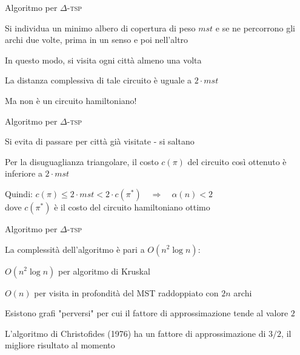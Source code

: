\begin{frame}{Algoritmo per $\Delta$-\textsc{tsp}}

\vspace{-9pt}
\BIL
\item Si individua un minimo albero di copertura di peso $\mathit{mst}$ e se ne percorrono gli archi due volte, prima in un senso e poi nell'altro 
\item In questo modo, si visita ogni città almeno una volta
\item La distanza complessiva di tale circuito è uguale a $2 \cdot \mathit{mst}$
\item Ma non è un circuito hamiltoniano!
\EIL

\vspace{-12pt}

\end{frame}

\begin{frame}{Algoritmo per $\Delta$-\textsc{tsp}}

\vspace{-9pt}
\BIL
\item Si evita di passare per città già visitate - si saltano
\item Per la disuguaglianza triangolare, il costo $c(\pi)$ del circuito così
ottenuto è inferiore a $2 \cdot \mathit{mst}$
\item Quindi:
$
  c(\pi) \leq 2 \cdot \mathit{mst} < 2 \cdot c(\pi^*) \quad \Rightarrow \quad \alpha(n) < 2
$\\
dove $c(\pi^*)$ è il costo del circuito hamiltoniano ottimo
\EIL

\vspace{-12pt}

\end{frame}

\begin{frame}{Algoritmo per $\Delta$-\textsc{tsp}}

\vspace{-9pt}
\begin{myboxtitle}[Note]
\BIL
\item La complessità dell'algoritmo è pari a $O(n^2 \log n)$:
  \BI
  \item $O(n^2 \log n)$ per algoritmo di Kruskal
  \item $O(n)$ per visita in profondità del MST raddoppiato con $2n$ archi
  \EI
\item Esistono grafi "perversi" per cui il fattore di approssimazione tende
al valore $2$
\item L'algoritmo di Christofides (1976) ha un fattore di approssimazione
di $3/2$, il migliore risultato al momento
\EIL
\end{myboxtitle}
  
\end{frame}

